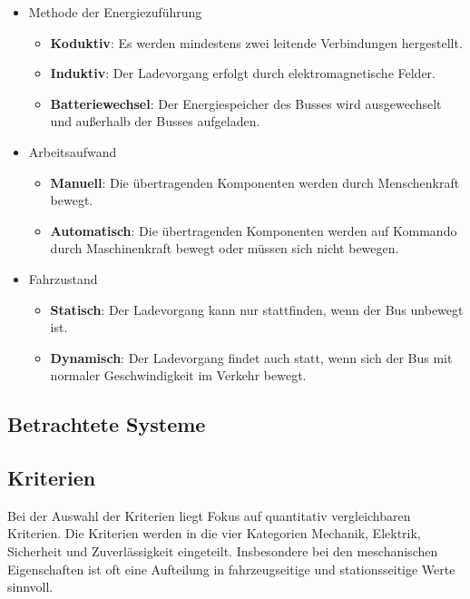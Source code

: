 \documentclass{scrartcl}
\begin{document}
\begin{itemize}
	\item Methode der Energiezuführung
	\begin{itemize}
		\item \textbf{Koduktiv}: Es werden mindestens zwei leitende Verbindungen hergestellt.
		\item \textbf{Induktiv}: Der Ladevorgang erfolgt durch elektromagnetische Felder.
		\item \textbf{Batteriewechsel}: Der Energiespeicher des Busses wird ausgewechselt und außerhalb der Busses aufgeladen.
	\end{itemize}
	\item Arbeitsaufwand
	\begin{itemize}
		\item \textbf{Manuell}: Die übertragenden Komponenten werden durch Menschenkraft bewegt.
		\item \textbf{Automatisch}: Die übertragenden Komponenten werden auf Kommando durch Maschinenkraft bewegt oder müssen sich nicht bewegen.
	\end{itemize}
	\item Fahrzustand
	\begin{itemize}
		\item \textbf{Statisch}: Der Ladevorgang kann nur stattfinden, wenn der Bus unbewegt ist.
		\item \textbf{Dynamisch}: Der Ladevorgang findet auch statt, wenn sich der Bus mit normaler Geschwindigkeit im Verkehr bewegt.
	\end{itemize}
\end{itemize}

\subsection{Betrachtete Systeme}

\subsection{Kriterien}
Bei der Auswahl der Kriterien liegt Fokus auf quantitativ vergleichbaren Kriterien. Die Kriterien werden in die vier Kategorien Mechanik, Elektrik, Sicherheit und Zuverlässigkeit eingeteilt. Insbesondere bei den meschanischen Eigenschaften ist oft eine Aufteilung in fahrzeugseitige und stationsseitige Werte sinnvoll.
\end{document}
